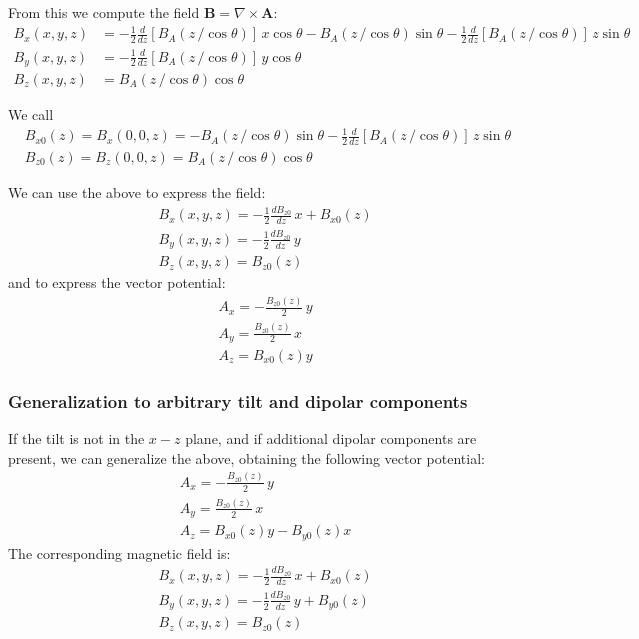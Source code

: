 From this we compute the field $\mathbf{B} = \nabla \times \mathbf{A}$:
\begin{align}
B_x(x,y,z) &= -\frac{1}{2} \frac{d}{dz} \left[B_A(z\,/\cos \theta)\right]\, x \cos\theta - B_A(z\,/\cos \theta) \sin\theta - \frac{1}{2}  \frac{d}{dz} \left[B_A(z\,/\cos \theta)\right] \, z \sin\theta  \\
B_y(x,y,z) &= -\frac{1}{2}  \frac{d}{dz} \left[B_A(z\,/\cos \theta)\right] \, y \cos\theta \\
B_z(x,y,z) &= B_A(z\,/\cos \theta) \cos\theta
\end{align}

We call
\begin{align}
&\boxed{B_{x0}(z) = B_x(0,0,z) = -B_A(z\,/\cos \theta) \sin\theta - \frac{1}{2} \frac{d}{dz} \left[B_A(z\,/\cos \theta)\right] \, z \sin\theta }\\
&\boxed{B_{z0}(z) = B_z(0,0,z) = B_A(z\,/\cos \theta) \cos\theta}
\end{align}

We can use the above to express the field:
\begin{align}
&\boxed{B_x(x,y,z) = -\frac{1}{2} \frac{dB_{z0}}{dz} \, x  + B_{x0}(z)} \\
&\boxed{B_y(x,y,z) = -\frac{1}{2} \frac{dB_{z0}}{dz} \, y} \\
&\boxed{B_z(x,y,z) = B_{z0}(z)}
\end{align}
and to express the vector potential:
\begin{align}
&\boxed{A_x = -\frac{B_{z0}(z)}{2} \, y}\\
&\boxed{A_y = \frac{B_{z0}(z)}{2} \, x}\\
&\boxed{A_z = B_{x0}(z) y}
\end{align}

\subsubsection{Generalization to arbitrary tilt and dipolar components}

If the tilt is not in the $x-z$ plane, and if additional dipolar components are present,
we can generalize the above, obtaining the following vector potential:
\begin{align}
&\boxed{A_x = -\frac{B_{z0}(z)}{2} \, y}\\
&\boxed{A_y = \frac{B_{z0}(z)}{2} \, x}\\
&\boxed{A_z = B_{x0}(z) y - B_{y0}(z) x}
\end{align}
The corresponding magnetic field is:
\begin{align}
&\boxed{B_x(x,y,z) = -\frac{1}{2} \frac{dB_{z0}}{dz} \, x  + B_{x0}(z)} \\
&\boxed{B_y(x,y,z) = -\frac{1}{2} \frac{dB_{z0}}{dz} \, y + B_{y0}(z)} \\
&\boxed{B_z(x,y,z) = B_{z0}(z)}
\end{align}

